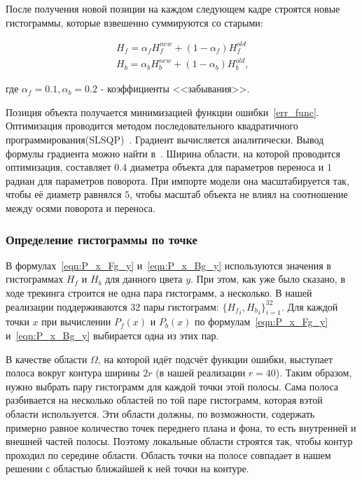 После получения новой позиции на каждом следующем кадре строятся новые
гистограммы, которые взвешенно суммируются со старыми: 

\begin{equation}
\begin{array}{c}
H_{f} = \alpha_f H_{f}^{new} + (1 - \alpha_f) H_f^{old} \\
H_{b} = \alpha_b H_{b}^{new} + (1 - \alpha_b) H_b^{old}
\text{,}
\end{array}
\end{equation}

где $\alpha_f = 0.1, \alpha_b = 0.2$ - коэффициенты <<забывания>>.

Позиция объекта получается минимизацией функции ошибки~\ref{err_func}.
Оптимизация проводится методом последовательного квадратичного
программирования(SLSQP)~\cite{SLSQP}.
Градиент вычисляется аналитически.
Вывод формулы градиента можно найти в~\cite{Tjaden2018}.
Ширина области, на которой проводится оптимизация, составляет $0.4$ диаметра
объекта для параметров переноса и $1$ радиан для параметров поворота.
При импорте модели она масштабируется так, чтобы её диаметр равнялся $5$, чтобы
масштаб объекта не влиял на соотношение между осями поворота и переноса.



\subsubsection*{Определение гистограммы по точке}
В формулах~\ref{eqn:P_x_Fg_y} и~\ref{eqn:P_x_Bg_y} используются значения в
гистограммах $H_f$ и $H_b$ для данного цвета $y$.
При этом, как уже было сказано, в ходе трекинга строится не одна пара
гистограмм, а несколько.
В нашей реализации поддерживаются 32 пары гистограмм: $\{{H_f}_i, {H_b}_i\}_{i
= 1}^{32}$.
Для каждой точки $x$ при вычислении $P_f(x)$ и $P_b(x)$ по
формулам~\ref{eqn:P_x_Fg_y} и~\ref{eqn:P_x_Bg_y} выбирается одна из этих пар.

В качестве области $\Omega$, на которой идёт подсчёт функции ошибки, выступает
полоса вокруг контура ширины $2r$ (в нашей реализации $r = 40$).
Таким образом, нужно выбрать пару гистограмм для каждой точки этой полосы.
Сама полоса разбивается на несколько областей по той паре гистограмм, которая
вэтой области используется.
Эти области должны, по возможности, содержать примерно равное количество точек
переднего плана и фона, то есть внутренней и внешней частей полосы.
Поэтому локальные области строятся так, чтобы контур проходил по середине
области.
Область точки на полосе совпадает в нашем решении с областью ближайшей к ней
точки на контуре.

